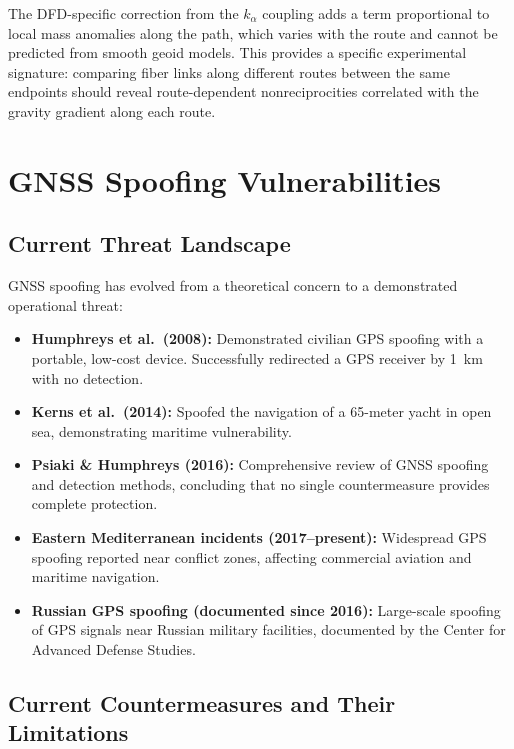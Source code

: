 \documentclass[12pt,letterpaper]{article}
\begin{document}
The DFD-specific correction from the $k_\alpha$ coupling adds a term
proportional to local mass anomalies along the path, which varies with
the route and cannot be predicted from smooth geoid models. This provides
a specific experimental signature: comparing fiber links along different
routes between the same endpoints should reveal route-dependent
nonreciprocities correlated with the gravity gradient along each route.

\section{GNSS Spoofing Vulnerabilities}

\subsection{Current Threat Landscape}

GNSS spoofing has evolved from a theoretical concern to a demonstrated
operational threat:

\begin{itemize}
\item \textbf{Humphreys et al.\ (2008):} Demonstrated civilian GPS
spoofing with a portable, low-cost device. Successfully redirected
a GPS receiver by 1~km with no detection.
\item \textbf{Kerns et al.\ (2014):} Spoofed the navigation of a
65-meter yacht in open sea, demonstrating maritime vulnerability.
\item \textbf{Psiaki \& Humphreys (2016):} Comprehensive review of
GNSS spoofing and detection methods, concluding that no single
countermeasure provides complete protection.
\item \textbf{Eastern Mediterranean incidents (2017--present):} Widespread
GPS spoofing reported near conflict zones, affecting commercial aviation
and maritime navigation.
\item \textbf{Russian GPS spoofing (documented since 2016):} Large-scale
spoofing of GPS signals near Russian military facilities, documented
by the Center for Advanced Defense Studies.
\end{itemize}

\subsection{Current Countermeasures and Their Limitations}
\end{document}
